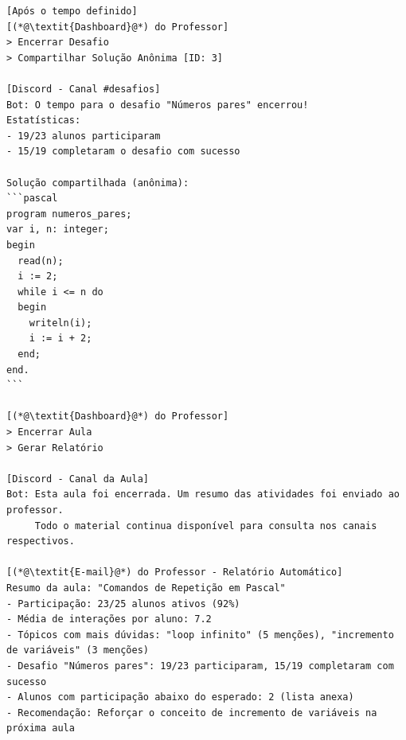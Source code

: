 \begin{lstlisting}
[Após o tempo definido]
[(*@\textit{Dashboard}@*) do Professor]
> Encerrar Desafio
> Compartilhar Solução Anônima [ID: 3]

[Discord - Canal #desafios]
Bot: O tempo para o desafio "Números pares" encerrou!
Estatísticas:
- 19/23 alunos participaram
- 15/19 completaram o desafio com sucesso

Solução compartilhada (anônima):
```pascal
program numeros_pares;
var i, n: integer;
begin
  read(n);
  i := 2;
  while i <= n do
  begin
    writeln(i);
    i := i + 2;
  end;
end.
```

[(*@\textit{Dashboard}@*) do Professor]
> Encerrar Aula
> Gerar Relatório

[Discord - Canal da Aula]
Bot: Esta aula foi encerrada. Um resumo das atividades foi enviado ao professor.
     Todo o material continua disponível para consulta nos canais respectivos.

[(*@\textit{E-mail}@*) do Professor - Relatório Automático]
Resumo da aula: "Comandos de Repetição em Pascal"
- Participação: 23/25 alunos ativos (92%)
- Média de interações por aluno: 7.2
- Tópicos com mais dúvidas: "loop infinito" (5 menções), "incremento de variáveis" (3 menções)
- Desafio "Números pares": 19/23 participaram, 15/19 completaram com sucesso
- Alunos com participação abaixo do esperado: 2 (lista anexa)
- Recomendação: Reforçar o conceito de incremento de variáveis na próxima aula
\end{lstlisting}
